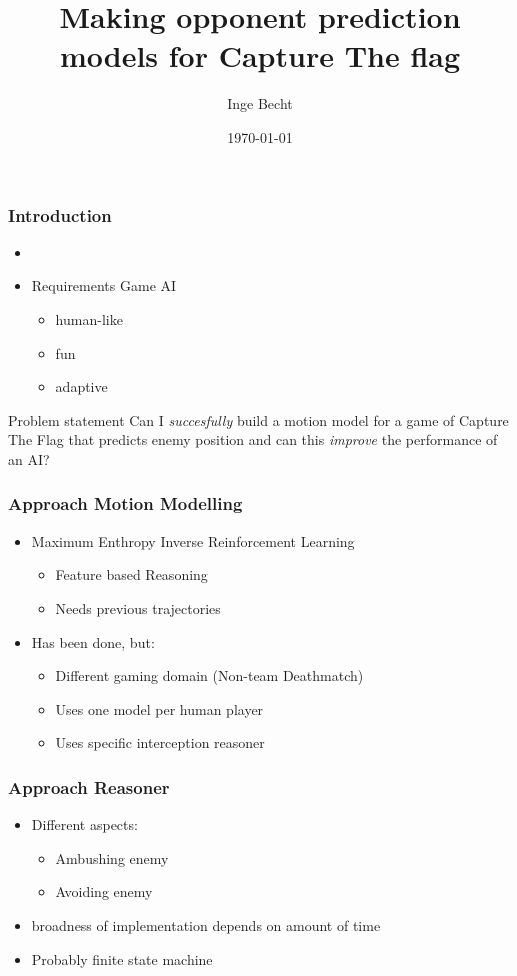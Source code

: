 \documentclass{beamer}
\title[Opponent prediction models]{Making opponent prediction models for Capture
The flag}
\author{Inge Becht}
\institute[University of Amsterdam]
{
University of Amsterdam \\
\medskip
{\emph{inge.becht91@gmail.com}}
}
\date{\today}
\begin{document}
%
\begin{frame}
\titlepage
\end{frame}
%
\begin{frame}
\frametitle{Introduction}
\begin{itemize}
\item{}
\item{Requirements Game AI}
    \begin{itemize}
        \item human-like
        \item fun
        \item adaptive
    \end{itemize}
\end{itemize}
\begin{block}{Problem statement}
Can I \emph{succesfully} build a motion model for a game of Capture The Flag that predicts enemy
position and can this \emph{improve} the performance of an AI?
\end{block}
\end{frame}

\begin{frame}
\frametitle{Approach Motion Modelling}
\begin{itemize}
    \item Maximum Enthropy Inverse Reinforcement Learning
    \begin{itemize}
        \item Feature based Reasoning
        \item Needs previous trajectories
    \end{itemize}
    \item Has been done, but:
        \begin{itemize}
            \item Different gaming domain (Non-team Deathmatch)
            \item Uses one model per human player
            \item Uses specific interception reasoner
        \end {itemize}
\end{itemize}
\end{frame}

\begin{frame}
\frametitle{Approach Reasoner}
\begin{itemize}
    \item Different aspects:
    \begin{itemize}
        \item Ambushing enemy
        \item Avoiding enemy
    \end{itemize}
    \item broadness of implementation depends on amount of time
    \item Probably finite state machine
\end{itemize}
\end{frame}
\end{document}
